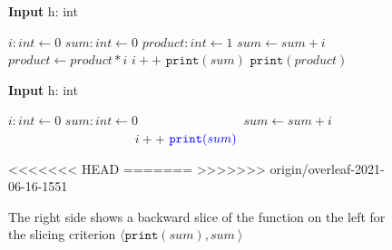 \begin{figure}
    \centering
    \begin{minipage}{.4\textwidth}
        \begin{algorithm}[H]
            \hspace*{\algorithmicindent} \textbf{Input} h: int \\
            \hspace*{1em}
            \begin{algorithmic}
                \State $i: int \leftarrow 0$
                \State $sum: int \leftarrow 0$
                \State $product: int \leftarrow 1$
                    \State $sum \leftarrow sum + i$
                    \State $product \leftarrow product * i$
                    \State $i++$
                \EndWhile
                \State $\mathtt{print}(sum)$
                \State $\mathtt{print}(product)$
            \end{algorithmic}
        \end{algorithm}
    \end{minipage}
    \hfill
    \begin{minipage}{.4\textwidth}
        \begin{algorithm}[H]
            \hspace*{\algorithmicindent} \textbf{Input} h: int \\
            \hspace*{1em}
            \begin{algorithmic}
                \State $i: int \leftarrow 0$
                \State $sum: int \leftarrow 0$
                \State $\color{white} product: int \leftarrow 1$
                    \State $sum \leftarrow sum + i$
                    \State $\color{white} product \leftarrow product * i$
                    \State $i++$
                \EndWhile
                \State $\color{blue} \mathtt{print}(sum)$
                \State $\color{white} \mathtt{print}(product)$
            \end{algorithmic}
        \end{algorithm}
    \end{minipage}
    \caption{The right side shows a backward slice of the function on the left for the slicing criterion $\langle \mathtt{print}(sum), sum \: \rangle$}
<<<<<<< HEAD
    \label{fig:slice}
=======
     \label{fig:slice}
>>>>>>> origin/overleaf-2021-06-16-1551
\end{figure}


